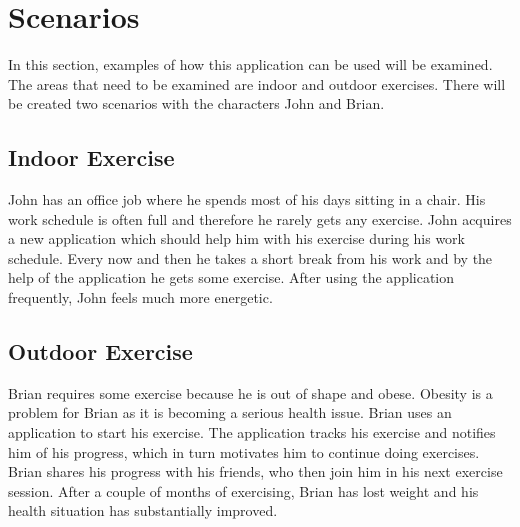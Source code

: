 \section{Scenarios}\label{section:scenarios}
In this section, examples of how this application can be used will be examined.
The areas that need to be examined are indoor and outdoor exercises.
There will be created two scenarios with the characters John and Brian.

\subsection{Indoor Exercise}
John has an office job where he spends most of his days sitting in a chair.
His work schedule is often full and therefore he rarely gets any exercise.
John acquires a new application which should help him with his exercise during his work schedule.
Every now and then he takes a short break from his work and by the help of the application he gets some exercise.
After using the application frequently, John feels much more energetic.

\subsection{Outdoor Exercise}
Brian requires some exercise because he is out of shape and obese.
Obesity is a problem for Brian as it is becoming a serious health issue.
Brian uses an application to start his exercise.
The application tracks his exercise and notifies him of his progress, which in turn motivates him to continue doing exercises.
Brian shares his progress with his friends, who then join him in his next exercise session.
After a couple of months of exercising, Brian has lost weight and his health situation has substantially improved.